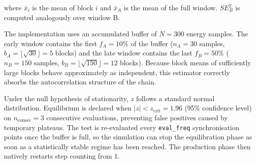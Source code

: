 where $\bar{x}_i$ is the mean of block $i$ and $\bar{x}_A$ is the mean
of the full window. $SE_B^2$ is computed analogously over window B.

The implementation uses an accumulated buffer of $N=300$ energy samples.
The early window contains the first $f_A=10\%$ of the buffer ($n_A=30$
samples, $b_A=\lfloor\sqrt{30}\rfloor=5$ blocks) and the late window
contains the last $f_B=50\%$ ($n_B=150$ samples,
$b_B=\lfloor\sqrt{150}\rfloor=12$ blocks). Because block means of
sufficiently large blocks behave approximately as independent, this
estimator correctly absorbs the autocorrelation structure of the chain.

Under the null hypothesis of stationarity, $z$ follows a standard
normal distribution. Equilibrium is declared when
$|z| < z_\mathrm{crit} = 1.96$ (95\% confidence level) on
$n_\mathrm{consec} = 3$ consecutive evaluations, preventing false
positives caused by temporary plateaus. The test is re-evaluated every
\texttt{eval\_freq} synchronisation points once the buffer is full,
so the simulation can stop the equilibration phase as soon as a
statistically stable regime has been reached. The production phase then
natively restarts step counting from 1.

